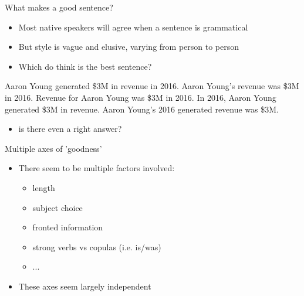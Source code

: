 \documentclass[10pt, compress]{beamer}		%
\begin{document}
\begin{frame}{What makes a good sentence?}
    \begin{itemize}
        \item Most native speakers will agree when a sentence is grammatical
        \item But style is vague and elusive, varying from person to person   \pause
        \item Which do think is the best sentence?
    \end{itemize}

    \begin{exe}
    	\ex \begin{xlist}
	        \ex Aaron Young generated \$3M in revenue in 2016.
	        \ex Aaron Young's revenue was \$3M in 2016.
	        \ex Revenue for Aaron Young was \$3M in 2016.
	        \ex In 2016, Aaron Young generated \$3M in revenue.
	        \ex Aaron Young's 2016 generated revenue was \$3M.
	    \end{xlist}
    \end{exe}

    \pause
    \begin{itemize}
    	\item is there even a right answer?
    \end{itemize}
\end{frame}

\begin{frame}{Multiple axes of 'goodness'}
	\begin{itemize}
		\item There seem to be multiple factors involved:
		\begin{itemize}
			\item length
			\item subject choice
			\item fronted information
			\item strong verbs vs copulas (i.e. is/was)
			\item ...	\pause
		\end{itemize}
		\item These axes seem largely independent
	\end{itemize}
\end{frame}
\end{document}
